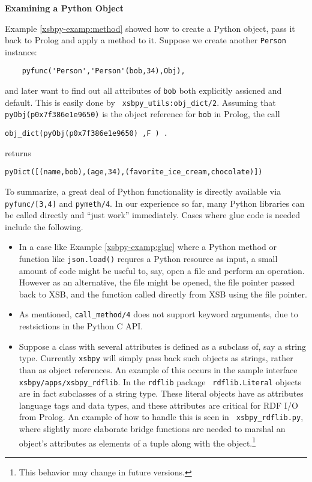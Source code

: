 \begin{example} \rm {\bf Examining a Python Object} \label{xsbpy-examp:exam-object}

\noindent
Example \ref{xsbpy-examp:method} showed how to create a Python object,
pass it back to Prolog and apply a method to it.  Suppose we create
another {\tt Person} instance:

\begin{verbatim}
    pyfunc('Person','Person'(bob,34),Obj),
\end{verbatim}
\noindent
and later want to find out all attributes of {\tt bob} both explicitly
assicned and default.  This is easily done by {\tt
  xsbpy\_utils:obj\_dict/2}.  Assuming that {\tt
  pyObj(p0x7f386e1e9650)} is the object reference for {\tt bob} in
Prolog, the call
\begin{verbatim}
obj_dict(pyObj(p0x7f386e1e9650) ,F ) .
\end{verbatim}
returns
\begin{verbatim}
pyDict([(name,bob),(age,34),(favorite_ice_cream,chocolate)])
\end{verbatim}
\end{example}

To summarize, a great deal of Python functionality is directly
available via {\tt pyfunc/[3,4]} and {\tt pymeth/4}.  In our
experience so far, many Python libraries can be called directly and
``just work'' immediately.  Cases where glue code is needed include
the following.

\begin{itemize}
\item In a case like Example \ref{xsbpy-examp:glue} where a Python
  method or function like {\tt json.load()} requres a Python resource
  as input, a small amount of code might be useful to, say, open a
  file and perform an operation.  However as an alternative, the file
  might be opened, the file pointer passed back to XSB, and the
  function called directly from XSB using the file pointer.

  \item As mentioned, {\tt call\_method/4} does not support keyword
    arguments, due to restsictions in the Python C API.

  \item Suppose a class with several attributes is defined as a
    subclass of, say a string type.  Currently {\tt xsbpy} will simply
    pass back such objects as strings, rather than as object
    references.  An example of this occurs in the sample interface
    {\tt xsbpy/apps/xsbpy\_rdflib}.  In the {\tt rdflib} package {\tt
      rdflib.Literal} objects are in fact subclasses of a string type.
    These literal objects have as attributes language tags and data
    types, and these attributes are critical for RDF I/O from Prolog.
    An example of how to handle this is seen in {\tt
      xsbpy\_rdflib.py}, where slightly more elaborate bridge
    functions are needed to marshal an object's attributes as elements
    of a tuple along with the object.\footnote{This behavior may
      change in future versions.}
\end{itemize}

